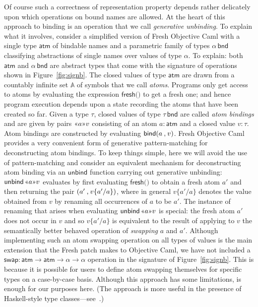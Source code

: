 \documentclass{LMCS}
\theoremstyle{plain}
\theoremstyle{definition}
\newcommand{\atm}[1][a]{#1}
\newcommand{\ATM}{\kw{atm}}
\newcommand{\Atom}{\mathbb{A}}
\newcommand{\BIND}{\kw{bind}}
\newcommand{\BINDTY}{\kw{bnd}}
\newcommand{\BINDVAL}[2]{\mathopen{\text{\normalfont\guillemotleft}}#1
  \mathclose{\text{\normalfont\guillemotright}}#2}
\newcommand{\FRESH}{\kw{fresh}}
\newcommand{\FUNTY}{\mathbin{\rightarrow}}
\newcommand{\LP}{\mathopen{\kw{(}}}
\newcommand{\kw}[1]{\mathsf{#1}}
\newcommand{\OFTY}{\mathrel{\kw{:}}}
\newcommand{\rename}[2]{\{#2/#1\}}
\newcommand{\RP}{\mathclose{\kw{)}}}
\newcommand{\SWAP}{\kw{swap}}
\newcommand{\ty}{\tau}
\newcommand{\TYVAR}{\alpha}
\newcommand{\UNBIND}{\kw{unbind}}
\newcommand{\UNITVAL}{\LP\RP}
\newcommand{\val}[1][v]{#1}
\begin{document}
Of course such a correctness of representation property depends rather
delicately upon which operations on bound names are allowed. At the
heart of this approach to binding is an operation that we call
\emph{generative unbinding}.  To explain what it involves, consider a
simplified version of Fresh Objective Caml with a single type $\ATM$
of bindable names and a parametric family of types $\TYVAR\,\BINDTY$
classifying abstractions of single names over values of type $\TYVAR$.
To explain: both $\ATM$ and $\TYVAR\,\BINDTY$ are abstract types that
come with the signature of operations shown in Figure~\ref{fig:signb}.
The closed values of type $\ATM$ are drawn from a countably infinite
set $\Atom$ of symbols that we call \emph{atoms}. Programs only get
access to atoms by evaluating the expression $\FRESH\UNITVAL$ to get a
fresh one; and hence program execution depends upon a state recording
the atoms that have been created so far. Given a type $\ty$, closed
values of type $\ty\,\BINDTY$ are called \emph{atom bindings} and are
given by pairs $\BINDVAL{\atm}{\val}$ consisting of an atom
$\atm\OFTY\ATM$ and a closed value $\val\OFTY\ty$.  Atom bindings are
constructed by evaluating $\BIND\PAIR{\atm}{\val}$. Fresh Objective
Caml provides a very convenient form of generative pattern-matching
for deconstructing atom bindings. To keep things simple, here we will
avoid the use of pattern-matching and consider an equivalent mechanism
for deconstructing atom binding via an $\UNBIND$ function carrying out
generative unbinding: $\UNBIND\,\BINDVAL{\atm}{\val}$ evaluates by
first evaluating $\FRESH\UNITVAL$ to obtain a fresh atom $\atm'$ and
then returning the pair $\PAIR{\atm'}{\val\rename{\atm}{\atm'}}$,
where in general $\val\rename{\atm}{\atm'}$ denotes the value obtained
from $\val$ by renaming all occurrences of $\atm$ to be $\atm'$. The
instance of renaming that arises when evaluating
$\UNBIND\,\BINDVAL{\atm}{\val}$ is special: the fresh atom $\atm'$
does not occur in $\val$ and so $\val\rename{\atm}{\atm'}$ is
equivalent to the result of applying to $\val$ the semantically better
behaved operation of \emph{swapping} $\atm$ and $\atm'$. Although
implementing such an atom swapping operation on all types of values is
the main extension that the Fresh patch makes to Objective Caml, we
have not included a $\SWAP\OFTY\ATM\FUNTY\ATM\FUNTY\TYVAR\FUNTY\TYVAR$
operation in the signature of Figure~\ref{fig:signb}. This is because
it is possible for users to define atom swapping themselves for
specific types on a case-by-case basis.  Although this approach has
some limitations, is enough for our purposes here.  (The approach is
more useful in the presence of Haskell-style type
classes---see~\cite{CheneyJ:scryn}.)
\end{document}
